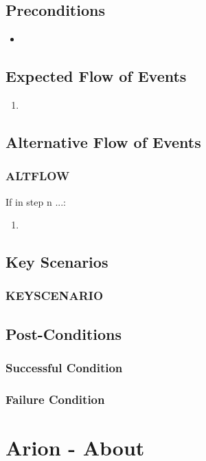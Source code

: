 \documentclass{scrreprt}
\begin{document}
\section{Preconditions}
\begin{itemize}
    \item 
\end{itemize}

\section{Expected Flow of Events}
\begin{enumerate}[1.]
    \item 
\end{enumerate}

\section{Alternative Flow of Events}

    \subsection{ALTFLOW}
    If in step n ...:
    \begin{enumerate}
        \item 
    \end{enumerate}

\section{Key Scenarios}
    \subsection{KEYSCENARIO}

\section{Post-Conditions}
    \subsection{Successful Condition}
    
    \subsection{Failure Condition}


\chapter{Arion - About}
\end{document}

